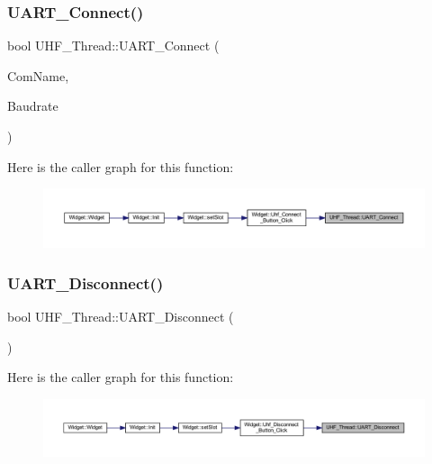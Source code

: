 \subsubsection{\texorpdfstring{UART\_Connect()}{UART\_Connect()}}
{\footnotesize\ttfamily bool U\+H\+F\+\_\+\+Thread\+::\+U\+A\+R\+T\+\_\+\+Connect (\begin{DoxyParamCaption}\item[{Q\+String}]{Com\+Name,  }\item[{int}]{Baudrate }\end{DoxyParamCaption})}

Here is the caller graph for this function\+:
\nopagebreak
\begin{figure}[H]
\begin{center}
\leavevmode
\includegraphics[width=350pt]{class_u_h_f___thread_a8a872370902a9eb489a836ab28d8044c_icgraph}
\end{center}
\end{figure}
\mbox{\label{class_u_h_f___thread_a4d29770cacd38ec97148b8642df794b8}} 
\subsubsection{\texorpdfstring{UART\_Disconnect()}{UART\_Disconnect()}}
{\footnotesize\ttfamily bool U\+H\+F\+\_\+\+Thread\+::\+U\+A\+R\+T\+\_\+\+Disconnect (\begin{DoxyParamCaption}{ }\end{DoxyParamCaption})}

Here is the caller graph for this function\+:
\nopagebreak
\begin{figure}[H]
\begin{center}
\leavevmode
\includegraphics[width=350pt]{class_u_h_f___thread_a4d29770cacd38ec97148b8642df794b8_icgraph}
\end{center}
\end{figure}
\mbox{\label{class_u_h_f___thread_a8fc7d9ed28c737bc95cc33fc780b8bc2}} 
